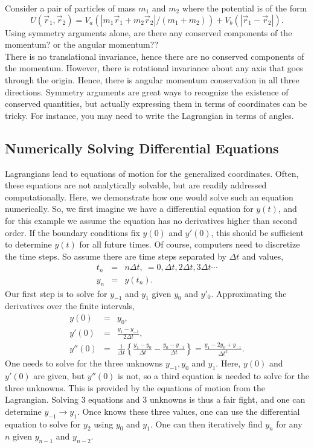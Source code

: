\example Consider a pair of particles of mass $m_1$ and $m_2$ where
the potential is of the form
\[
U(\vec{r}_1,\vec{r}_2)=V_a(|m_1\vec{r}_1+m_2\vec{r}_2|/(m_1+m_2))+V_b(|\vec{r}_1-\vec{r}_2|).
\]
Using symmetry arguments alone, are there any conserved components of
the momentum? or the angular momentum??\\

There is no translational invariance, hence there are no conserved
components of the momentum. However, there is rotational invariance
about any axis that goes through the origin. Hence, there is angular
momentum conservation in all three directions. Symmetry arguments are
great ways to recognize the existence of conserved quantities, but
actually expressing them in terms of coordinates can be tricky. For
instance, you may need to write the Lagrangian in terms of angles.

\exampleend

\subsection{Numerically Solving Differential Equations}

Lagrangians lead to equations of motion for the generalized
coordinates. Often, these equations are not analytically solvable, but
are readily addressed computationally. Here, we demonstrate how one
would solve such an equation numerically. So, we first imagine we have
a differential equation for $y(t)$, and for this example we assume the
equation has no derivatives higher than second order. If the boundary
conditions fix $y(0)$ and $y'(0)$, this should be sufficient to
determine $y(t)$ for all future times. Of course, computers need to
discretize the time steps. So assume there are time steps separated by
$\Delta t$ and values,
\begin{eqnarray}
t_n&=&n\Delta t,~=0,\Delta t, 2\Delta t, 3\Delta t\cdots\\ \nonumber
y_n&=&y(t_n).
\end{eqnarray}
Our first step is to solve for $y_{-1}$ and $y_1$ given $y_0$ and
$y'_0$. Approximating the derivatives over the finite intervals,
\begin{eqnarray}
y(0)&=&y_0,\\ \nonumber y'(0)&=&\frac{y_1-y_{-1}}{2\Delta
  t},\\ \nonumber y''(0)&=&\frac{1}{\Delta
  t}\left\{\frac{y_1-y_0}{\Delta t}-\frac{y_0-y_{-1}}{\Delta
  t}\right\} =\frac{y_1-2y_0+y_{-1}}{\Delta t^2}.
\end{eqnarray}
One needs to solve for the three unknowns $y_{-1},y_0$ and
$y_1$. Here, $y(0)$ and $y'(0)$ are given, but $y''(0)$ is not, so a
third equation is needed to solve for the three unknowns. This is
provided by the equations of motion from the Lagrangian. Solving 3
equations and 3 unknowns is thus a fair fight, and one can determine
$y_{-1}\rightarrow y_1$. Once knows these three values, one can use
the differential equation to solve for $y_2$ using $y_0$ and
$y_1$. One can then iteratively find $y_n$ for any $n$ given $y_{n-1}$
and $y_{n-2}$.

